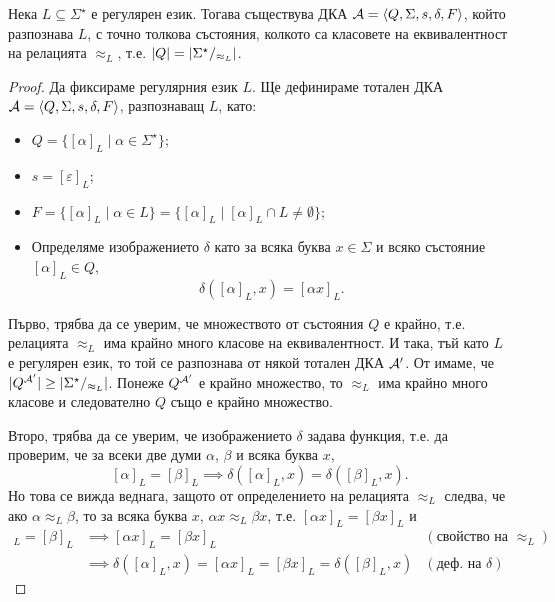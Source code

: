 \begin{thm}
  \label{th:myhill-nerode}
  Нека $L\subseteq \Sigma^\star$ е регулярен език.
  Тогава съществува ДКА $\mathcal{A} = \langle{Q,\Sigma,s,\delta,F}\rangle$, който разпознава $L$,
  с точно толкова състояния, колкото са класовете на еквивалентност на релацията $\approx_L$,
  т.е. $\lvert{Q}\rvert = \lvert{\Sigma^\star/_{\approx_L}}\rvert$.
\end{thm}
\begin{proof}
  Да фиксираме регулярния език $L$.
  Ще дефинираме тотален ДКА $\mathcal{A} = \langle{Q,\Sigma,s,\delta,F}\rangle$, разпознаващ $L$, като:
  \begin{itemize}
  \item
    $Q = \{[\alpha]_L\mid \alpha\in \Sigma^\star\}$;
  \item
    $s = [\varepsilon]_L$;
  \item
    $F = \{[\alpha]_L\mid \alpha\in L\} = \{[\alpha]_L \mid [\alpha]_L \cap L \neq \emptyset\}$;
  \item
    Определяме изображението $\delta$ като 
    за всяка буква $x \in \Sigma$ и всяко състояние $[\alpha]_L\in Q$, 
    \[\delta([\alpha]_L,x) = [\alpha x]_L.\]
  \end{itemize}
  
  Първо, трябва да се уверим, че множеството от състояния $Q$ е крайно, т.е.
  релацията $\approx_L$ има крайно много класове на еквивалентност.
  И така, тъй като $L$ е регулярен език, то той се разпознава от някой тотален ДКА $\mathcal{A}'$.
  От  имаме, че $\lvert{Q^{\mathcal{A}'}}\rvert \geq \lvert{\Sigma^\star/_{\approx_L}}\rvert$.
  Понеже $Q^{\mathcal{A}'}$ е крайно множество, то $\approx_L$ има крайно много класове и 
  следователно $Q$ също е крайно множество.

  Второ, трябва да се уверим, че изображението $\delta$ задава функция, т.е. 
  да проверим, че за всеки две думи $\alpha$, $\beta$ и всяка буква $x$,
  \[[\alpha]_L = [\beta]_L \implies \delta([\alpha]_L,x) = \delta([\beta]_L,x).\]
  Но това се вижда веднага, защото от определението на релацията $\approx_L$ следва, че
  ако $\alpha \approx_L \beta$, то за всяка буква $x$, $\alpha x \approx_L \beta x$,
  т.е. $[\alpha x]_L = [\beta x]_L$ и 
  \begin{align*}
    [\alpha]_L = [\beta]_L & \implies [\alpha x]_L = [\beta x]_L & (\text{свойство на }\approx_L)\\
    & \implies \delta([\alpha]_L,x) = [\alpha x]_L = [\beta x]_L = \delta([\beta]_L,x) & (\text{деф. на }\delta)
  \end{align*}
  

\end{proof}
